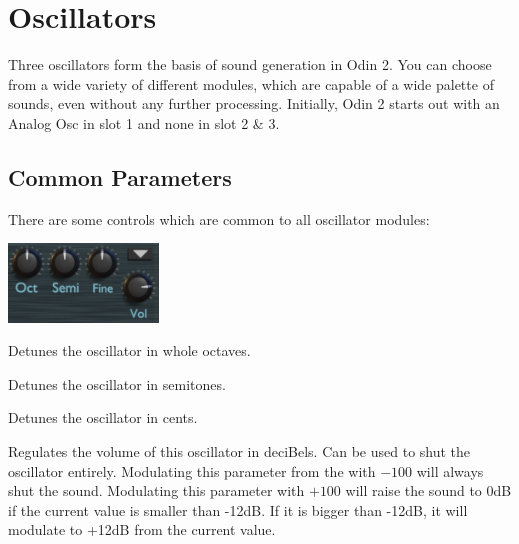 \chapter{Oscillators}
Three oscillators form the basis of sound generation in Odin 2. You can choose from a wide variety of different modules, which are capable of a wide palette of sounds, even without any further processing. Initially, Odin 2 starts out with an Analog Osc in slot 1 and none in slot 2 \& 3. 
\vspace{5mm}


\section{Common Parameters}
There are some controls which are common to all oscillator modules:

\begin{center}
    \includegraphics[width=0.3\textwidth]{graphics/osc_common.png}
\end{center}

{Detunes the oscillator in whole octaves.}

{Detunes the oscillator in semitones.}

{Detunes the oscillator in cents.}

{Regulates the volume of this oscillator in deciBels. Can be used to shut the oscillator entirely. Modulating this parameter from the \modmatrix  with $-100$ will always shut the sound. Modulating this parameter with $+100$ will raise the sound to 0dB if the current value is smaller than -12dB. If it is bigger than -12dB, it will modulate to +12dB from the current value.}

